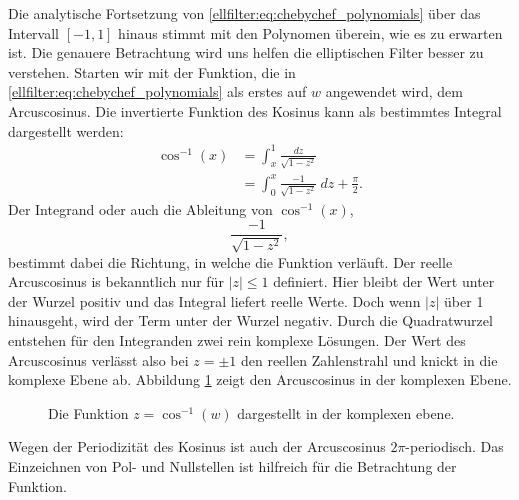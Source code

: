 Die analytische Fortsetzung von \eqref{ellfilter:eq:chebychef_polynomials} über das Intervall $[-1,1]$ hinaus stimmt mit den Polynomen überein, wie es zu erwarten ist.
Die genauere Betrachtung wird uns helfen die elliptischen Filter besser zu verstehen.
Starten wir mit der Funktion, die in \eqref{ellfilter:eq:chebychef_polynomials} als erstes auf $w$ angewendet wird, dem Arcuscosinus.
Die invertierte Funktion des Kosinus kann als bestimmtes Integral dargestellt werden:
\begin{align}
    \cos^{-1}(x)
    &=
    \int_{x}^{1}
    \frac{
        dz
    }{
        \sqrt{
            1-z^2
        }
    }\\
    &=
    \int_{0}^{x}
    \frac{
        -1
    }{
        \sqrt{
            1-z^2
        }
    }
    ~dz
    + \frac{\pi}{2}.
\end{align}
Der Integrand oder auch die Ableitung von $\cos^{-1}(x)$,
\begin{equation}
    \frac{
        -1
    }{
        \sqrt{
            1-z^2
        }
    },
\end{equation}
bestimmt dabei die Richtung, in welche die Funktion verläuft.
Der reelle Arcuscosinus is bekanntlich nur für $|z| \leq 1$ definiert.
Hier bleibt der Wert unter der Wurzel positiv und das Integral liefert reelle Werte.
Doch wenn $|z|$ über 1 hinausgeht, wird der Term unter der Wurzel negativ.
Durch die Quadratwurzel entstehen für den Integranden zwei rein komplexe Lösungen.
Der Wert des Arcuscosinus verlässt also bei $z= \pm 1$ den reellen Zahlenstrahl und knickt in die komplexe Ebene ab.
Abbildung \ref{ellfilter:fig:arccos} zeigt den Arcuscosinus in der komplexen Ebene.
\begin{figure}
    \centering
    
    \caption{Die Funktion $z = \cos^{-1}(w)$ dargestellt in der komplexen ebene.}
    \label{ellfilter:fig:arccos}
\end{figure}
Wegen der Periodizität des Kosinus ist auch der Arcuscosinus $2\pi$-periodisch.
Das Einzeichnen von Pol- und Nullstellen ist hilfreich für die Betrachtung der Funktion.


